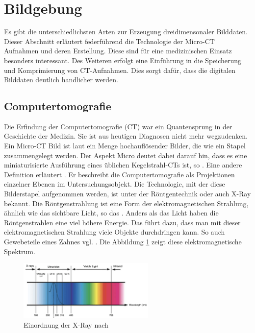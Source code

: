 \section{Bildgebung}
\label{sec:technologisch} Es gibt die unterschiedlichsten Arten zur Erzeugung
dreidimensonaler Bilddaten. Dieser Abschnitt erläutert federführend die Technologie
der Micro-CT Aufnahmen und deren Erstellung. Diese sind für eine medizinischen
Einsatz besonders interessant. Des Weiteren erfolgt eine Einführung in die Speicherung
und Komprimierung von CT-Aufnahmen. Dies sorgt dafür, dass die digitalen Bilddaten
deutlich handlicher werden.

\subsection{Computertomografie}
\label{subsec:computertomografie} Die Erfindung der Computertomografie (CT) war ein
Quantensprung in der Geschichte der Medizin. Sie ist aus heutigen Diagnosen
nicht mehr wegzudenken. Ein Micro-CT Bild ist laut \citet[Abstract]{baird2017} ein
Menge hochauflösender Bilder, die wie ein Stapel zusammengelegt werden. Der Aspekt
Micro deutet dabei darauf hin, dass es eine miniaturisierte Ausführung eines
üblichen Kegelstrahl-CTs ist, so \citet[Seite 340]{buzug2011}. Eine andere
Definition erläutert \citet{lehmann2013bildverarbeitung}. Er beschreibt die
Computertomografie als Projektionen einzelner Ebenen im Untersuchungsobjekt. Die
Technologie, mit der diese Bilderstapel aufgenommen werden, ist unter der Röntgentechnik
oder auch X-Ray bekannt. Die Röntgenstrahlung ist eine Form der
elektromagnetischen Strahlung, ähnlich wie das sichtbare Licht, so das \citet{nib2024}.
Anders als das Licht haben die Röntgenstrahlen eine viel höhere Energie. Das führt
dazu, dass man mit dieser elektromagnetischen Strahlung viele Objekte
durchdringen kann. So auch Gewebeteile eines Zahnes vgl. \citep{nib2024}. Die
Abbildung \ref{fig:spectrum} zeigt diese elektromagnetische Spektrum.

\begin{figure}[h]
	\centering
	\includegraphics[width=0.6\textwidth]{img/x_ray.jpg}
	\caption{Einordnung der \ac{X-Ray} nach \citet{zwinkels2015}}
	\label{fig:spectrum}
\end{figure}

